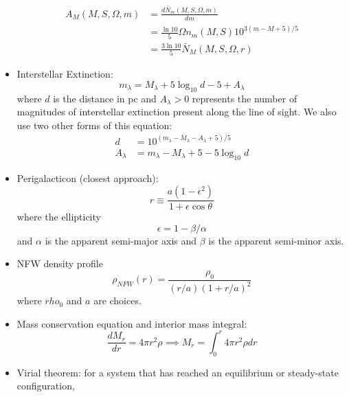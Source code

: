 \documentclass{book}
\begin{document}
\begin{itemize}
\begin{align*}
              A_M (M, S, \Omega, m) & = \frac{d\bar{N}_m (M, S, \Omega, m)}{dm}                       \\
                                    & = \frac{\ln 10}{5} \Omega n_m (M, S) 10^{3(m - M +5)/5}         \\
                                    & = \frac{3 \ln 10}{5} \bar{N}_M(M, S, \Omega, r) \tag{C\&O 24.5}
          \end{align*}
    \item Interstellar Extinction:
          \begin{equation*}
              m_\lambda = M_\lambda + 5 \log_{10} d - 5 + A_\lambda \tag{C\&O 12.1}
          \end{equation*}
          where $d$ is the distance in pc and $A_\lambda > 0$ represents the number of magnitudes of interstellar extinction present along the line of sight. We also use two other forms of this equation:
          \begin{align*}
              d         & = 10^{(m_\lambda - M_\lambda - A_\lambda + 5)/5}            \\
              A_\lambda & = m_\lambda - M_\lambda + 5 - 5 \log_{10} d \tag{C\&O 24.1}
          \end{align*}
    \item Perigalacticon (closest approach):
          \begin{equation*}
              r \equiv \frac{a (1 - \epsilon^2)}{1 + \epsilon \cos \theta}
          \end{equation*}
          where the ellipticity
          \begin{equation*}
              \epsilon = 1 - \beta/\alpha \tag{C\&O 25.1}
          \end{equation*}
          and $\alpha$ is the apparent semi-major axis and $\beta$ is the apparent semi-minor axis.
    \item NFW density profile
          \begin{equation*}
              \rho_{NFW} (r) = \frac{\rho_0}{(r/a)(1+r/a)^2} \tag{C\&O 24.52}
          \end{equation*}
          where $rho_0$ and $a$ are choices.
    \item Mass conservation equation and interior mass integral:
          \begin{equation*}
              \frac{dM_r}{dr} = 4 \pi r^2 \rho \implies M_r = \int_0^r 4 \pi r^2 \rho dr \tag{C\&O 10.7}
          \end{equation*}
    \item Virial theorem: for a system that has reached an equilibrium or steady-state configuration,

\end{itemize}
\end{document}

